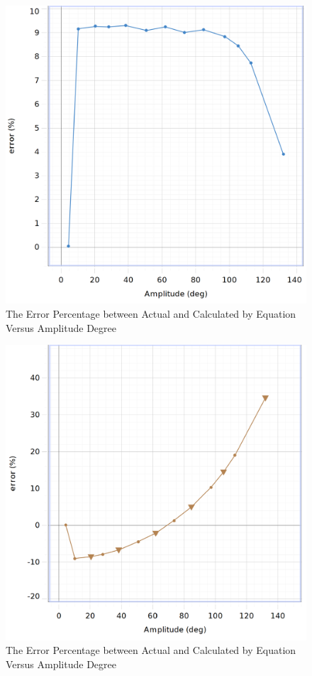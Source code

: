 \begin{figure}[H]
  \centering\includegraphics[width=15cm]{figErrorVersusDegree.png}
  \caption{The Error Percentage between Actual and Calculated by Equation  Versus Amplitude Degree}
  \label{figErrorVersusDegree}
\end{figure}
\begin{figure}[H]
  \centering\includegraphics[width=15cm]{figErrorSimp.png}
  \caption{The Error Percentage between Actual and Calculated by Equation  Versus Amplitude Degree}
  \label{figErrorSimp}
\end{figure}
